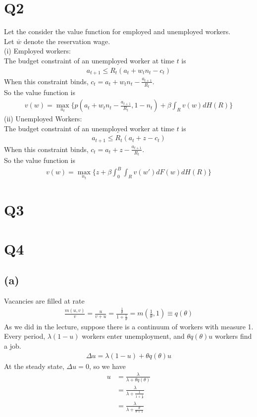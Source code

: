 \documentclass{ltjsarticle}
\begin{document}
\section*{Q2}
Let the consider the value function for employed and unemployed workers.\\
Let $\bar{w}$ denote the reservation wage.\\
(i) Employed workers:\\
The budget constraint of an unemployed worker at time $t$ is
\begin{align*}
    a_{t+1} \leq R_t(a_t + w_tn_t - c_t)
\end{align*}
When this constraint binds, $c_t = a_t + w_tn_t - \frac{a_{t+1}}{R_t}$.\\
So the value function is
\begin{align*}
    v(w) = \max_{n_t} \{ p(a_t + w_tn_t - \frac{a_{t+1}}{R_t}, 1 - n_t) + \beta\int_R v(w)dH(R) \}
\end{align*}
(ii) Unemployed Workers:\\
The budget constraint of an unemployed worker at time $t$ is
\begin{align*}
    a_{t+1} \leq R_t(a_t + z - c_t)
\end{align*}
When this constraint binds, $c_t = a_t + z - \frac{a_{t+1}}{R_t}$.\\
So the value function is
\begin{align*}
    v(w) = \max_{n_t} \{ z + \beta \int^B_0 \int_R v(w') dF(w) dH(R) \}
\end{align*}


\section*{Q3}

\section*{Q4}

\subsection*{(a)}

Vacancies are filled at rate
\begin{gather*}
  \frac{m(u,v)}{v} = \frac{u}{v+u} = \frac{\frac{1}{\theta}}{1+\frac{1}{\theta}} = m \left(\frac{1}{\theta}, 1\right) \equiv q(\theta)
\end{gather*}
As we did in the lecture, suppose there is a continuum of workers with measure 1. Every period, $\lambda(1-u)$ workers enter unemployment, and $\theta q(\theta) u $ workers find a job.
\begin{gather*}
  \Delta u = \lambda(1-u) + \theta q(\theta) u
\end{gather*}
At the steady state, $\Delta u = 0$, so we have
\begin{align*}
  u 
  &= \frac{\lambda}{\lambda + \theta q(\theta)}\\
  &= \frac{\lambda}{\lambda + \frac{1}{1+\frac{1}{\theta}}}\\
  &= \frac{\lambda}{\lambda + \frac{\theta}{\theta+1}}
\end{align*}
\end{document}
